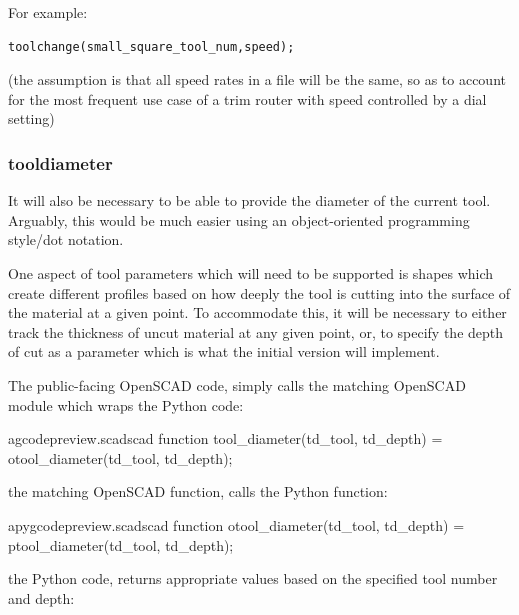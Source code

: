 \documentclass{ltxdoc}
\begin{document}
For example:

\begin{verbatim}
toolchange(small_square_tool_num,speed);
\end{verbatim}

\noindent (the assumption is that all speed rates in a file will be the same, so as to account for the most frequent use case of a trim router with speed controlled by a dial setting)

\subsubsection{tooldiameter}

It will also be necessary to be able to provide the diameter of the current tool. Arguably, this would be much easier using an object-oriented programming style/dot notation.

One aspect of tool parameters which will need to be supported is shapes which create different profiles based on how deeply the tool is cutting into the surface of the material at a given point. To accommodate this, it will be necessary to either track the thickness of uncut material at any given point, or, to specify the depth of cut as a parameter which is what the initial version will implement.

The public-facing OpenSCAD code,  simply calls the matching OpenSCAD module which wraps the Python code:
 
\lstset{firstnumber=\thegcpscad}
\begin{writecode}{a}{gcodepreview.scad}{scad}
function tool_diameter(td_tool, td_depth) = otool_diameter(td_tool, td_depth);

\end{writecode}
\addtocounter{gcpscad}{2}

\noindent the matching OpenSCAD function,  calls the Python function:

\lstset{firstnumber=\thepyscad}
\begin{writecode}{a}{pygcodepreview.scad}{scad}
function otool_diameter(td_tool, td_depth) = ptool_diameter(td_tool, td_depth);

\end{writecode}
\addtocounter{pyscad}{2}
 
\noindent the Python code,  returns 
appropriate values based on the specified tool number and depth:
 
\end{document}

